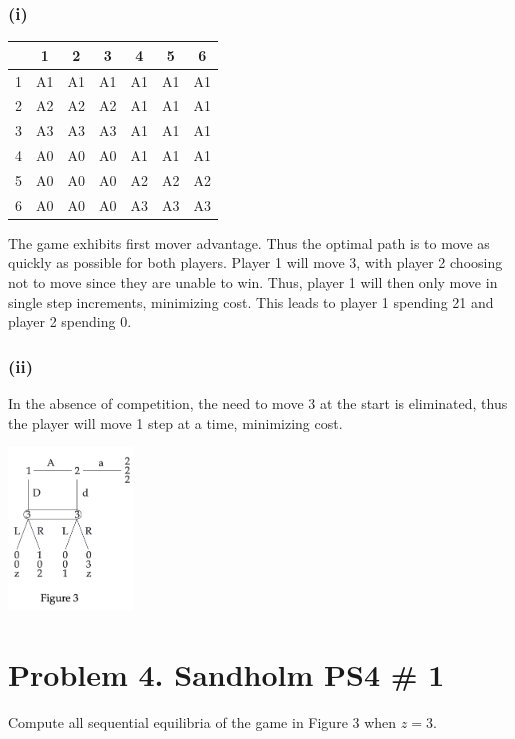 \documentclass[10pt, a4paper]{article}
\begin{document}
    \subsubsection*{(i)}
      \begin{center}
        \begin{tabular}{|c|c|c|c|c|c|c|}
          \hline
          & 1 & 2 & 3 & 4 & 5 & 6 \\
          \hline
          1 & A1 & A1 & A1 & A1 & A1 & A1 \\
          2 & A2 & A2 & A2 & A1 & A1 & A1 \\
          3 & A3 & A3 & A3 & A1 & A1 & A1 \\
          4 & A0 & A0 & A0 & A1 & A1 & A1 \\
          5 & A0 & A0 & A0 & A2 & A2 & A2 \\
          6 & A0 & A0 & A0 & A3 & A3 & A3 \\
          \hline
        \end{tabular}
      \end{center}
    The game exhibits first mover advantage. Thus the optimal path is to move as quickly as possible for both players. Player 1 will move 3, with player 2 choosing not to move since they are unable to win. Thus, player 1 will then only move in single step increments, minimizing cost. This leads to player 1 spending 21 and player 2 spending 0. 
  \subsubsection*{(ii)}
    In the absence of competition, the need to move 3 at the start is eliminated, thus the player will move 1 step at a time, minimizing cost.
  \begin{center}
    \includegraphics[width=0.25\textwidth]{fig3.png}
  \end{center}
\section*{Problem 4. Sandholm PS4 \# 1}
  Compute all sequential equilibria of the game in Figure 3 when $z=3$.
\end{document}
